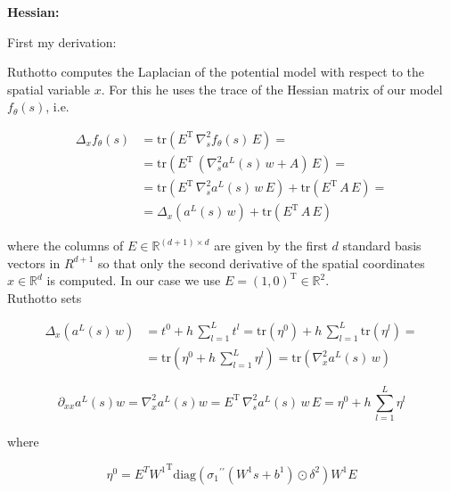 \textbf{Hessian:}

First my derivation:

Ruthotto computes the Laplacian of the potential model with respect to the spatial variable $x$. For this he uses the trace of the Hessian matrix of our model $f_{\theta}\left(s\right)$, i.e. 

\begin{align*}
    \Delta_x f_{\theta}\left(s\right) & = \mathrm{tr}\left(E^{\mathrm{T}} \, \nabla^{2}_s f_{\theta}\left(s\right) \, E\right) = \\
    & = \mathrm{tr}\left(E^{\mathrm{T}} \, \left(\nabla^{2}_s a^{L}\left(s\right) \, w + A\right) \, E\right) = \\
    & = \mathrm{tr}\left(E^{\mathrm{T}} \, \nabla^{2}_s a^{L}\left(s\right) \, w \, E\right) + \mathrm{tr}\left(E^{\mathrm{T}} \,  A \, E\right) = \\
    & = \Delta_x \left(a^{L}\left(s\right) \, w\right) + \mathrm{tr}\left(E^{\mathrm{T}} \,  A \, E\right)
\end{align*}

where the columns of $E \in \mathbb{R}^{\left(d+1\right) \times d}$ are given by the first $d$ standard basis vectors in $R^{d+1}$ so that only the second derivative of the spatial coordinates $x \in \mathbb{R}^d$ is computed. In our case we use $E = \left(1, 0\right)^{\mathrm{T}} \in \mathbb{R}^{2}$. \\
Ruthotto sets

\begin{align*}
    \Delta_x \left(a^{L}\left(s\right) \, w\right) & = t^{0} + h \, \sum^{L}_{l=1} t^{l} = \mathrm{tr}\left(\eta^{0}\right) + h \, \sum^{L}_{l=1} \mathrm{tr}\left(\eta^{l}\right) = \\
    & = \mathrm{tr} \left( \eta^{0} + h \, \sum^{L}_{l=1} \eta^{l} \right) = \mathrm{tr} \left( \nabla^{2}_x a^{L}\left(s\right) \, w \right)
\end{align*}

\begin{equation*}
    \partial_{xx} a^{L}\left(s\right) w = \nabla^{2}_x a^{L}\left(s\right) w = E^{\mathrm{T}} \, \nabla^{2}_s a^{L}\left(s\right) \, w \, E = \eta^{0} + h \, \sum^{L}_{l=1} \eta^{l}
\end{equation*}

where 

\begin{equation*}
    \eta^{0} = E^T {W^{1}}^{\mathrm{T}} \mathrm{diag}\left({\sigma_{1}}^{\prime \prime}\left(W^{1} s + b^{1}\right) \odot \delta^{2}\right) W^{1} E
\end{equation*}

